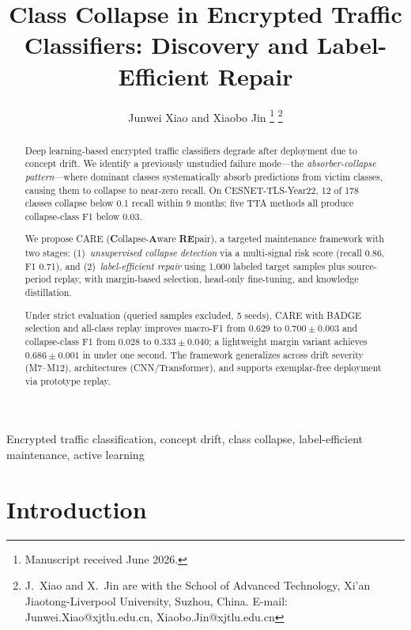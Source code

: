 \documentclass[journal]{IEEEtran}
\newcommand{\ours}{CARE}  %
\begin{document}
\title{Class Collapse in Encrypted Traffic Classifiers: Discovery and Label-Efficient Repair}

\author{
  Junwei Xiao
  and Xiaobo Jin
  \thanks{Manuscript received June 2026.}
  \thanks{J.~Xiao and X.~Jin are with the School of Advanced Technology, Xi'an Jiaotong-Liverpool University, Suzhou, China. E-mail: Junwei.Xiao@xjtlu.edu.cn, Xiaobo.Jin@xjtlu.edu.cn}
}

\maketitle

\begin{abstract}
Deep learning-based encrypted traffic classifiers degrade after deployment due to concept drift.
We identify a previously unstudied failure mode---the \textit{absorber-collapse pattern}---where dominant classes systematically absorb predictions from victim classes, causing them to collapse to near-zero recall.
On CESNET-TLS-Year22, 12 of 178 classes collapse below 0.1 recall within 9 months; five TTA methods all produce collapse-class F1 below 0.03.

We propose \ours{} (\textbf{C}ollapse-\textbf{A}ware \textbf{RE}pair), a targeted maintenance framework with two stages: (1)~\textit{unsupervised collapse detection} via a multi-signal risk score (recall 0.86, F1 0.71), and (2)~\textit{label-efficient repair} using 1{,}000 labeled target samples plus source-period replay, with margin-based selection, head-only fine-tuning, and knowledge distillation.

Under strict evaluation (queried samples excluded, 5 seeds), \ours{} with BADGE selection and all-class replay improves macro-F1 from 0.629 to $0.700{\pm}0.003$ and collapse-class F1 from 0.028 to $0.333{\pm}0.040$; a lightweight margin variant achieves $0.686{\pm}0.001$ in under one second.
The framework generalizes across drift severity (M7--M12), architectures (CNN/Transformer), and supports exemplar-free deployment via prototype replay.
\end{abstract}

\begin{IEEEkeywords}
Encrypted traffic classification, concept drift, class collapse, label-efficient maintenance, active learning
\end{IEEEkeywords}

\section{Introduction}
\label{sec:intro}
\end{document}
